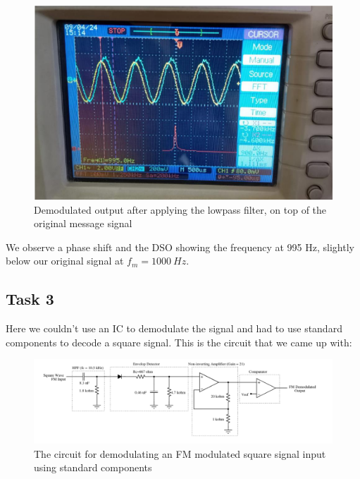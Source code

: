 \documentclass{article}
\begin{document}
\begin{figure}[!ht]
\includegraphics[width=\textwidth]{Filtered.png}
\caption{Demodulated output after applying the lowpass filter, on top of the original message signal}
\label{fig:LPFd}
\end{figure}

We observe a phase shift and the DSO showing the frequency at 995 Hz, slightly below our original signal at $f_m=1000 \ Hz$. 
\subsection{Task 3}
Here we couldn't use an IC to demodulate the signal and had to use standard components to decode a square signal. This is the circuit that we came up with:
\begin{figure}[!ht]
\includegraphics[width=\textwidth]{Demod_1.png}
\caption{The circuit for demodulating an FM modulated square signal input using standard components}
\label{fig:cir_1}
\end{figure}
\end{document}
